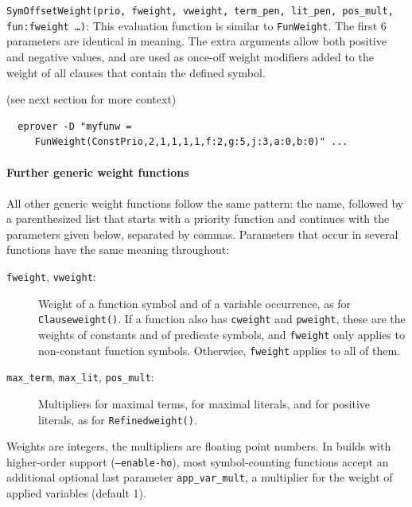 \documentclass{report}
\begin{document}
\medskip
\begin{sloppypar}
  \noindent{}\texttt{SymOffsetWeight(prio, fweight, vweight,
    term\_pen, lit\_pen, pos\_mult, fun:fweight \ldots)}:
  This evaluation function is similar to \texttt{FunWeight}. The first
  6 parameters are identical in meaning.  The extra arguments allow
  both positive and negative values, and are used as once-off weight
  modifiers added to the weight of all clauses that contain the
  defined symbol.

  \begin{example}
    (see next section for more context)
\begin{verbatim}
  eprover -D "myfunw =
     FunWeight(ConstPrio,2,1,1,1,1,f:2,g:5,j:3,a:0,b:0)" ...
\end{verbatim}
  \end{example}

\end{sloppypar}


\paragraph{Further generic weight functions}
\label{sec:options:moreweights}
\begingroup\raggedright

All other generic weight functions follow the same pattern: the name,
followed by a parenthesized list that starts with a priority function
and continues with the parameters given below, separated by
commas. Parameters that occur in several functions have the same
meaning throughout:
\begin{description}
\item[\texttt{fweight}, \texttt{vweight}:] Weight of a function symbol
  and of a variable occurrence, as for \texttt{Clauseweight()}. If a
  function also has \texttt{cweight} and \texttt{pweight}, these
  are the weights of constants and of predicate symbols, and
  \texttt{fweight} only applies to non-constant function
  symbols. Otherwise, \texttt{fweight} applies to all of them.
\item[\texttt{max\_term}, \texttt{max\_lit}, \texttt{pos\_mult}:]
  Multipliers for maximal terms, for maximal literals, and for
  positive literals, as for \texttt{Refinedweight()}.
\end{description}
Weights are integers, the multipliers are floating point numbers. In
builds with higher-order support (\texttt{--enable-ho}), most
symbol-counting functions accept an additional optional last
parameter \texttt{app\_var\_mult}, a multiplier for the weight of
applied variables (default 1).
\end{document}
